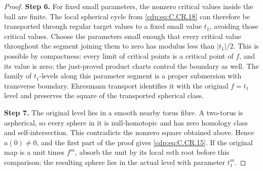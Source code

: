 \begin{proof}
\noindent\textbf{Step 6.} For fixed small parameters, the nonzero critical
values inside the ball are finite. The local
spherical cycle from \eqref{cdp:eq:C.CR.18} can therefore be transported
through regular target values to a fixed small
value $t_1$, avoiding those critical values.
Choose the parameters small enough that every
critical value throughout the segment joining
them to zero has modulus less than $|t_1|/2$.
This is possible by compactness: every limit of
critical points is a critical point of $f$, and
its value is zero; the just-proved product charts
control the boundary as well. The family of
$t_1$-levels along this parameter segment is a
proper submersion with transverse boundary.
Ehresmann transport identifies it with the
original $f=t_1$ level and preserves the square
of the transported spherical class.

\noindent\textbf{Step 7.} The original level lies in a smooth nearby torus
fibre. A two-torus is aspherical, so every sphere
in it is null-homotopic and has zero homology
class and self-intersection. This contradicts
the nonzero square obtained above. Hence $a(0)\ne0$,
and the first part of the proof gives \eqref{cdp:eq:C.CR.15}.
If the original map is a unit times $f^m$, absorb
the unit by its local $m$th root before this
comparison; the resulting sphere lies in the
actual level with parameter $t_1^m$.
\end{proof}







